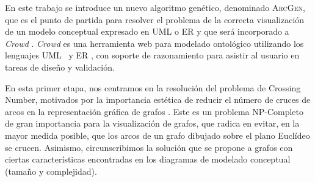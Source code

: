 	
	
	
	
	En este trabajo se introduce un nuevo algoritmo  genético,  denominado \textsc{ArcGen},  que es el  punto de partida  para  resolver el problema de la correcta visualización de un modelo conceptual expresado en UML o  ER  y que será incorporado a {\it Crowd} \cite{gimenez2016crowd}. {\it Crowd} es una herramienta web para modelado ontológico utilizando los lenguajes  UML \cite{booch2005unified}\ y  ER \cite{chen1988entity}, con soporte de razonamiento para asistir al usuario en tareas de diseño y validación. 
	
	En esta primer etapa,  nos centramos en la resolución del problema de Crossing Number, motivados por la  importancia  estética de reducir el número de cruces de arcos en la representación gráfica de grafos \cite{Kob14}. Este es un problema NP-Completo \cite{garey1983crossing} de gran importancia para la visualización de grafos, que radica en evitar, en la mayor medida posible, que los arcos de un grafo dibujado sobre el plano Euclídeo se crucen.
	Asimismo, circunscribimos la solución que se propone  a grafos con ciertas características encontradas en los diagramas de modelado conceptual (tamaño y complejidad).
	
	
